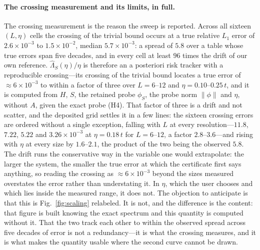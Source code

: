 \paragraph{The crossing measurement and its limits, in full.} The crossing measurement is the reason the sweep is reported. Across all sixteen
$(L,\eta)$ cells the crossing of the trivial bound occurs at a true relative $L_1$ error of
$2.6\times10^{-3}$ to $1.5\times10^{-2}$, median $5.7\times10^{-3}$: a spread of $5.8$ over a table
whose true errors span five decades, and in every cell at least $96$ times the drift of our own
reference. $\widehat\Lambda_S(\eta)/\eta$ is therefore an a posteriori risk tracker with a reproducible crossing---its
crossing of the trivial bound locates a true error of ${\approx}6\times10^{-3}$ to within a factor of
three over $L=6$--$12$ and $\eta=0.10$--$0.25\,t$, and it is computed from $H$, $S$, the retained probe $\phi_S$,
the probe norm $\lVert\phi\rVert$ and $\eta$, without $A$, given the exact probe (H4). That factor of three is a drift and not scatter, and the
deposited grid settles it in a few lines: the sixteen crossing errors are ordered without a single
exception, falling with $L$ at every resolution---$11.8$, $7.22$, $5.22$ and $3.26\times10^{-3}$ at
$\eta=0.18\,t$ for $L=6$--$12$, a factor $2.8$--$3.6$---and rising with $\eta$ at every size by
$1.6$--$2.1$, the product of the two being the observed $5.8$. The drift runs the conservative way in
the variable one would extrapolate: the larger the system, the smaller the true error at which the
certificate first says anything, so reading the crossing as ${\approx}6\times10^{-3}$ beyond the sizes
measured overstates the error rather than understating it. In $\eta$, which the user chooses and which
lies inside the measured range, it does not. The objection to anticipate is that this is
Fig.~\ref{fig:scaling} relabeled. It is not, and the difference is the content: that figure is built
knowing the exact spectrum and this quantity is computed without it. That the two track each other to
within the observed spread across five decades of error is not a redundancy---it is what the crossing measures, and it
is what makes the quantity usable where the second curve cannot be drawn.

